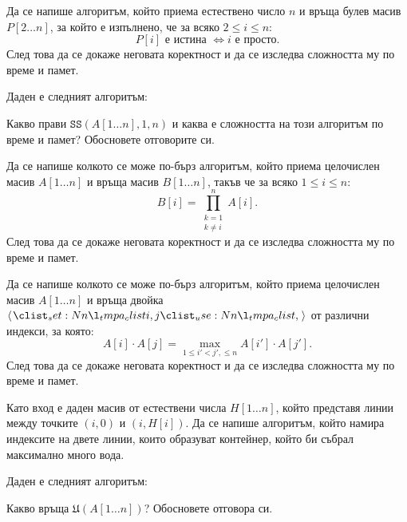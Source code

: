 \begin{problem}
Да се напише алгоритъм, който приема естествено число $n$ и връща булев масив $P[2 \dots n]$, за който е изпълнено, че за всяко $2 \leq i \leq n$:
\[
    P[i] \text{ е истина } \iff i \text{ е просто}.
\]
След това да се докаже неговата коректност и да се изследва сложността му по време и памет.
\end{problem}

\begin{problem}
Даден е следният алгоритъм:

Какво прави $\mathtt{SS}(A[1 \dots n], 1, n)$ и каква е сложността на този алгоритъм по време и памет?
Обосновете отговорите си.
\end{problem}

\begin{problem}
Да се напише колкото се може по-бърз алгоритъм, който приема целочислен масив $A[1 \dots n]$ и връща масив $B[1 \dots n]$, такъв че за всяко $1 \leq i \leq n$:
\[
    B[i] = \prod\limits_{\substack{k = 1 \\ k \neq i}}^n A[i].
\]
След това да се докаже неговата коректност и да се изследва сложността му по време и памет.
\end{problem}

\begin{problem}
Да се напише колкото се може по-бърз алгоритъм, който приема целочислен масив $A[1 \dots n]$ и връща двойка $\opair{i, j}$ от различни индекси, за която:
\[
    A[i] \cdot A[j] = \max\limits_{1 \leq i' < j', \leq n} A[i'] \cdot A[j'].
\]
След това да се докаже неговата коректност и да се изследва сложността му по време и памет.
\end{problem}

\begin{problem}
Като вход е даден масив от естествени числа $H[1 \dots n]$, който представя линии между точките $(i, 0)$ и $(i, H[i])$.
Да се напише алгоритъм, който намира индексите на двете линии, които образуват контейнер, който би събрал максимално много вода.
\end{problem}

\newpage

\begin{problem}
Даден е следният алгоритъм:

Какво връща $\mathfrak{U}(A[1 \dots n])$?
Обосновете отговора си.
\end{problem}